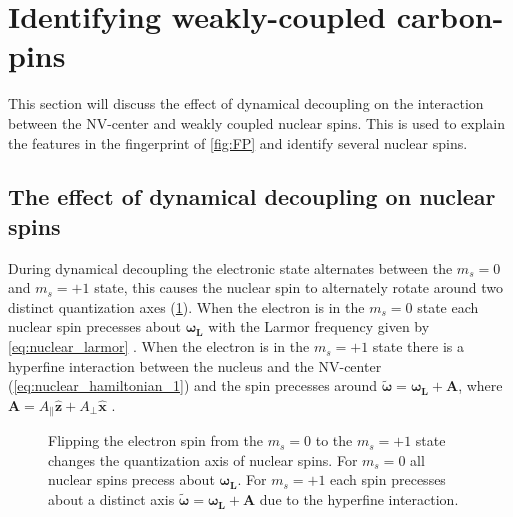 \section{Identifying weakly-coupled carbon-pins}
This section will discuss the effect of dynamical decoupling on the interaction between the NV-center and weakly coupled nuclear spins.
This is used to explain the features in the fingerprint of \cref{fig:FP} and identify several nuclear spins.

\subsection{The effect of dynamical decoupling on nuclear spins}

During dynamical decoupling the electronic state alternates between the $m_s = 0$ and $m_s =+1$ state, this causes the nuclear spin to alternately rotate around two distinct quantization axes (\cref{fig:quantax}).
When the electron is in the $m_s=0$ state each nuclear spin precesses about $\bm{\omega_L}$ with the Larmor frequency given by \cref{eq:nuclear_larmor} .
When the electron is in the $m_s=+1$ state there is a hyperfine interaction between the nucleus and the NV-center (\cref{eq:nuclear_hamiltonian_1}) and the spin precesses around $\bm{\tilde{\omega}}=\bm{\omega_L} +\bm{A}$, where $\bm{A} = A_\parallel \bm{\hat{z}} + A_\perp \bm{\hat{x}}$ \citep{Taminiau2012Detection}.


\begin{figure}[htbp]
\centering

\caption{Flipping the electron spin from the  $m_s=0$ to the $m_s= +1$ state changes the quantization axis of nuclear spins. For  $m_s=0$ all nuclear spins precess about $\bm{\omega_L}$. For  $m_s=+1$ each spin precesses about a distinct axis $\bm{\tilde{\omega}}=\bm{\omega_L} +\bm{A}$ due to the hyperfine interaction.}
\label{fig:quantax}
\end{figure}


